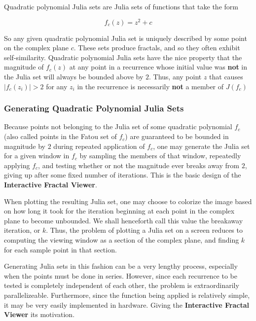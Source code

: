 \documentclass{article}
\begin{document}
Quadratic polynomial Julia sets are Julia sets of functions that take the form

$$
f_c(z) = z^2 + c
$$

So any given quadratic polynomial Julia set is uniquely described by some point on the complex plane $c$. These sets produce fractals, and so they often exhibit self-similarity. Quadratic polynomial Julia sets have the nice property that the magnitude of $f_c(z)$ at any point in a recurrence whose initial value was \textbf{not} in the Julia set will always be bounded above by $2$. Thus, any point $z$ that causes $|f_c(z_i)| > 2$ for any $z_i$ in the recurrence is necessarily \textbf{not} a member of $J(f_c)$

\subsubsection{Generating Quadratic Polynomial Julia Sets}

Because points not belonging to the Julia set of some quadratic polynomial $f_c$ (also called points in the Fatou set of $f_c$) are guaranteed to be bounded in magnitude by $2$ during repeated application of $f_c$, one may generate the Julia set for a given window in $f_c$ by sampling the members of that window, repeatedly applying $f_c$, and testing whether or not the magnitude ever breaks away from $2$, giving up after some fixed number of iterations. This is the basic design of the \textbf{Interactive Fractal Viewer}. 

When plotting the resulting Julia set, one may choose to colorize the image based on how long it took for the iteration beginning at each point in the complex plane to become unbounded. We shall henceforth call this value the breakaway iteration, or $k$. Thus, the problem of plotting a Julia set on a screen reduces to computing the viewing window as a section of the complex plane, and finding $k$ for each sample point in that section.

Generating Julia sets in this fashion can be a very lengthy process, especially when the points must be done in series. However, since each recurrence to be tested is completely independent of each other, the problem is extraordinarily parallelizeable. Furthermore, since the function being applied is relatively simple, it may be very easily implemented in hardware. Giving the \textbf{Interactive Fractal Viewer} its motivation.
\end{document}
